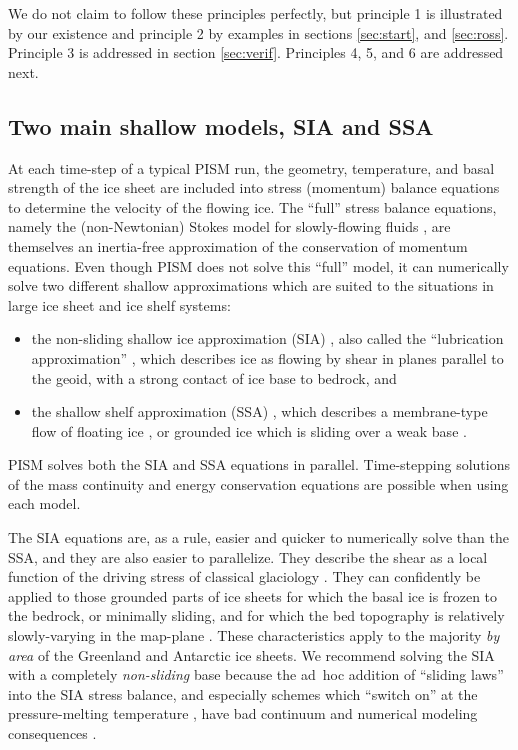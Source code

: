 \documentclass[titlepage,letterpaper,final]{scrartcl}
\begin{document}
\noindent We do not claim to follow these principles perfectly, but principle 1 is illustrated by our existence and principle 2 by examples in sections \ref{sec:start}, and \ref{sec:ross}.  Principle 3 is addressed in section \ref{sec:verif}.  Principles 4, 5, and 6 are addressed next.


\subsection{Two main shallow models, SIA and SSA}  At each time-step of a typical PISM run, the geometry, temperature, and basal strength of the ice sheet are included into stress (momentum) balance equations to determine the velocity of the flowing ice.   The ``full'' stress balance equations, namely the (non-Newtonian) Stokes model for slowly-flowing fluids \cite{Fowler}, are themselves an inertia-free approximation of the conservation of momentum equations.  Even though PISM does not solve this ``full'' model, it can numerically solve two different shallow approximations which are suited to the situations in large ice sheet and ice shelf systems:
\begin{itemize}
\item the non-sliding shallow ice approximation (SIA) \cite{Hutter}, also called the ``lubrication approximation'' \cite{Fowler}, which describes ice as flowing by shear in planes parallel to the geoid, with a strong contact of ice base to bedrock, and
\item the shallow shelf approximation (SSA) \cite{WeisGreveHutter}, which describes a membrane-type flow of floating ice \cite{Morland}, or grounded ice which is sliding over a weak base \cite{MacAyeal,SchoofStream}.
\end{itemize}
PISM solves both the SIA and SSA equations in parallel.  Time-stepping solutions of the mass continuity and energy conservation equations are possible when using each model.

The SIA equations are, as a rule, easier and quicker to numerically solve than the SSA, and they are also easier to parallelize.  They describe the shear as a local function of the driving stress of classical glaciology \cite{Paterson}.  They can confidently be applied to those grounded parts of ice sheets for which the basal ice is frozen to the bedrock, or minimally sliding, and for which the bed topography is relatively slowly-varying in the map-plane \cite{Fowler}.  These characteristics apply to the majority \emph{by area} of the Greenland and Antarctic ice sheets.  We recommend solving the SIA with a completely \emph{non-sliding} base because the ad~hoc addition of ``sliding laws'' into the SIA stress balance, and especially schemes which ``switch on'' at the pressure-melting temperature \cite{EISMINT00}, have bad continuum and numerical modeling consequences \cite[appendix B]{BBssasliding}.
\end{document}
